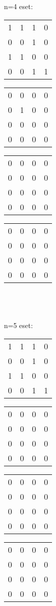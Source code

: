 \documentclass[paper=a4, fontsize=11pt]{article}
\begin{document}
n=4 eset:
\begin{tabular}{cccc}
1&1&1&0\\
0&0&1&0\\
1&1&0&0\\
0&0&1&1
\end{tabular}
\quad
\begin{tabular}{cccc}
0&0&0&0\\
0&1&0&0\\
0&0&0&0\\
0&0&0&0
\end{tabular}
\quad
\begin{tabular}{cccc}
0&0&0&0\\
0&0&0&0\\
0&0&0&0\\
0&0&0&0
\end{tabular}
\quad
\begin{tabular}{cccc}
0&0&0&0\\
0&0&0&0\\
0&0&0&0\\
0&0&0&0
\end{tabular}
\\
\\
\\
n=5 eset:
\begin{tabular}{cccc}
1&1&1&0\\
0&0&1&0\\
1&1&0&0\\
0&0&1&1
\end{tabular}
\quad
\begin{tabular}{cccc}
0&0&0&0\\
0&0&0&0\\
0&0&0&0\\
0&0&0&0
\end{tabular}
\quad
\begin{tabular}{cccc}
0&0&0&0\\
0&0&0&0\\
0&0&0&0\\
0&0&0&0
\end{tabular}
\quad
\begin{tabular}{cccc}
0&0&0&0\\
0&0&0&0\\
0&0&0&0\\
0&0&0&0
\end{tabular}
\end{document}
